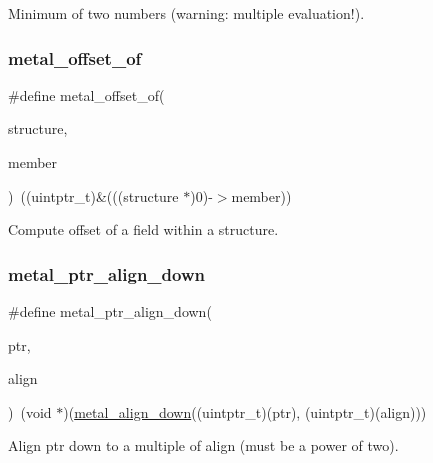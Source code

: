 Minimum of two numbers (warning\+: multiple evaluation!). \mbox{\label{group__utilities_gae60f3b54d150788936f856605ae97771}} 
\subsubsection{\texorpdfstring{metal\+\_\+offset\+\_\+of}{metal\_offset\_of}}
{\footnotesize\ttfamily \#define metal\+\_\+offset\+\_\+of(\begin{DoxyParamCaption}\item[{}]{structure,  }\item[{}]{member }\end{DoxyParamCaption})~((uintptr\+\_\+t)\&(((structure $\ast$)0)-\/$>$member))}

Compute offset of a field within a structure. \mbox{\label{group__utilities_gaf31231a9208f8a5474f3c72dff89fab9}} 
\subsubsection{\texorpdfstring{metal\+\_\+ptr\+\_\+align\+\_\+down}{metal\_ptr\_align\_down}}
{\footnotesize\ttfamily \#define metal\+\_\+ptr\+\_\+align\+\_\+down(\begin{DoxyParamCaption}\item[{}]{ptr,  }\item[{}]{align }\end{DoxyParamCaption})~(void $\ast$)(\hyperlink{group__utilities_ga156203f45b1730445ff94ea22f619917}{metal\+\_\+align\+\_\+down}((uintptr\+\_\+t)(ptr), (uintptr\+\_\+t)(align)))}

Align \textquotesingle{}ptr\textquotesingle{} down to a multiple of \textquotesingle{}align\textquotesingle{} (must be a power of two). \mbox{\label{group__utilities_ga4fe28bcda40d18f0ede123b6fb81abee}} 
